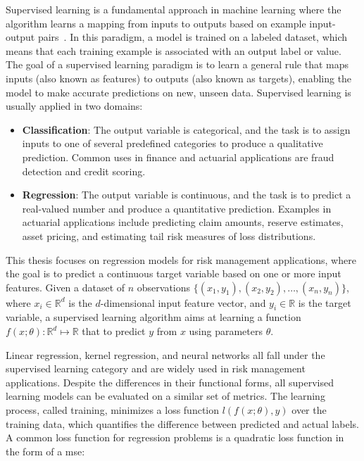 Supervised learning is a fundamental approach in machine learning where the algorithm learns a mapping from inputs to outputs based on example input-output pairs~\cite{galton1886regression}.
In this paradigm, a model is trained on a labeled dataset, which means that each training example is associated with an output label or value.
The goal of a supervised learning paradigm is to learn a general rule that maps inputs (also known as features) to outputs (also known as targets), enabling the model to make accurate predictions on new, unseen data.
Supervised learning is usually applied in two domains:
\begin{itemize} 
    \item \textbf{Classification}: The output variable is categorical, and the task is to assign inputs to one of several predefined categories to produce a qualitative prediction.
    Common uses in finance and actuarial applications are fraud detection and credit scoring.
    \item \textbf{Regression}: The output variable is continuous, and the task is to predict a real-valued number and produce a quantitative prediction.
    Examples in actuarial applications include predicting claim amounts, reserve estimates, asset pricing, and estimating tail risk measures of loss distributions.
\end{itemize}

This thesis focuses on regression models for risk management applications, where the goal is to predict a continuous target variable based on one or more input features.
Given a dataset of $n$ observations $\{(x_1, y_1), (x_2, y_2), \ldots, (x_n, y_n)\}$, where $x_i \in \mathbb{R}^d$ is the $d$-dimensional input feature vector, and $y_i \in \mathbb{R}$ is the target variable, a supervised learning algorithm aims at learning a function $f(x;\theta): \mathbb{R}^d \mapsto \mathbb{R}$ that to predict $y$ from $x$ using parameters $\theta$.

Linear regression, kernel regression, and neural networks all fall under the supervised learning category and are widely used in risk management applications.
Despite the differences in their functional forms, all supervised learning models can be evaluated on a similar set of metrics.
The learning process, called training, minimizes a loss function $l(f(x; \theta),y)$ over the training data, which quantifies the difference between predicted and actual labels.
A common loss function for regression problems is a quadratic loss function in the form of a \gls{mse}:

